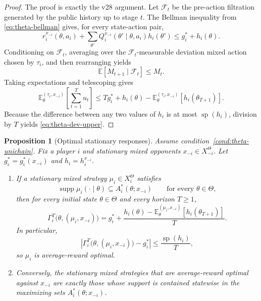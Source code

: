 \documentclass[11pt]{article}
\newtheorem{proposition}[theorem]{Proposition}
\theoremstyle{definition}
\newcommand{\E}{\mathbb{E}}
\newcommand{\1}{\mathbf{1}}
\DeclareMathOperator{\spn}{sp}
\DeclareMathOperator{\supp}{supp}
\begin{document}
\begin{proof}
The proof is exactly the v28 argument. Let $\mathcal F_t$ be the pre-action filtration generated by the public history up to stage $t$. The Bellman inequality from \eqref{eq:theta-bellman} gives, for every state-action pair,
\[
r_i^{x_{-i}}(\theta,a_i)+\sum_{\theta'}Q_i^{x_{-i}}(\theta'\mid \theta,a_i)h_i(\theta')
\le g_i^*+h_i(\theta).
\]
Conditioning on $\mathcal F_t$, averaging over the $\mathcal F_t$-measurable deviation mixed action chosen by $\tau_i$, and then rearranging yields
\[
\E[M_{t+1}\mid\mathcal F_t]\le M_t.
\]
Taking expectations and telescoping gives
\[
\E_\theta^{(\tau_i,x_{-i})}\!\left[\sum_{t=1}^{T}u_t\right]
\le Tg_i^*+h_i(\theta)-\E_\theta^{(\tau_i,x_{-i})}[h_i(\theta_{T+1})].
\]
Because the difference between any two values of $h_i$ is at most $\spn(h_i)$, division by $T$ yields \eqref{eq:theta-dev-upper}.
\end{proof}

\begin{proposition}[Optimal stationary responses]\label{prop:theta-optimal-stationary}
Assume condition~\ref{cond:theta-unichain}. Fix a player $i$ and stationary mixed opponents $x_{-i}\in X_{-i}^\Theta$. Let $g_i^*=g_i^*(x_{-i})$ and $h_i=h_i^{x_{-i}}$.
\begin{enumerate}[label=\textup{(\alph*)},leftmargin=2.4em]
\item If a stationary mixed strategy $\mu_i\in X_i^\Theta$ satisfies
\[
\supp \mu_i(\cdot\mid \theta)\subseteq A_i^*(\theta;x_{-i})
\qquad\text{for every }\theta\in\Theta,
\]
then for every initial state $\theta\in\Theta$ and every horizon $T\ge1$,
\begin{equation}\label{eq:theta-exact-identity}
\Gamma_i^T\bigl(\theta,(\mu_i,x_{-i})\bigr)
=
g_i^*+\frac{h_i(\theta)-\E_\theta^{(\mu_i,x_{-i})}[h_i(\theta_{T+1})]}{T}.
\end{equation}
In particular,
\begin{equation}\label{eq:theta-exact-bound}
\left|\Gamma_i^T\bigl(\theta,(\mu_i,x_{-i})\bigr)-g_i^*\right|
\le \frac{\spn(h_i)}{T},
\end{equation}
so $\mu_i$ is average-reward optimal.
\item Conversely, the stationary mixed strategies that are average-reward optimal against $x_{-i}$ are exactly those whose support is contained statewise in the maximizing sets $A_i^*(\theta;x_{-i})$.
\end{enumerate}
\end{proposition}
\end{document}
